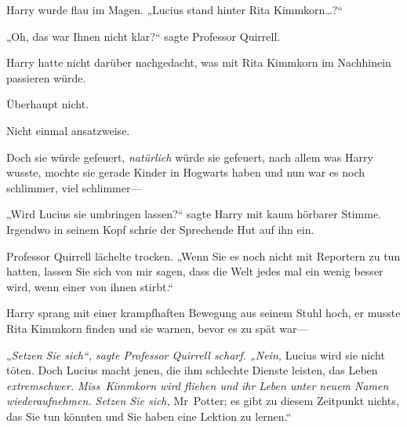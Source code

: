 Harry wurde flau im Magen. „Lucius stand hinter Rita Kimmkorn…?“

„Oh, das war Ihnen nicht klar?“ sagte Professor Quirrell.

Harry hatte nicht darüber nachgedacht, was mit Rita Kimmkorn im Nachhinein passieren würde.

Überhaupt nicht.

Nicht einmal ansatzweise.

Doch sie würde gefeuert, \emph{natürlich} würde sie gefeuert, nach allem was Harry wusste, mochte sie gerade Kinder in Hogwarts haben und nun war es noch schlimmer, viel schlimmer—

„Wird Lucius sie umbringen lassen?“ sagte Harry mit kaum hörbarer Stimme. Irgendwo in seinem Kopf schrie der Sprechende Hut auf ihn ein.

Professor Quirrell lächelte trocken. „Wenn Sie es noch nicht mit Reportern zu tun hatten, lassen Sie sich von mir sagen, dass die Welt jedes mal ein wenig besser wird, wenn einer von ihnen stirbt.“

Harry sprang mit einer krampfhaften Bewegung aus seinem Stuhl hoch, er musste Rita Kimmkorn finden und sie warnen, bevor es zu spät war—

„\emph{Setzen Sie sich“, sagte Professor Quirrell scharf. „Nein,} Lucius wird sie nicht töten. Doch Lucius macht jenen, die ihm schlechte Dienste leisten, das Leben \emph{extremschwer. Miss~Kimmkorn wird fliehen und ihr Leben unter neuem Namen wiederaufnehmen.} \emph{Setzen Sie sich,} Mr~Potter; es gibt zu diesem Zeitpunkt nichts, das Sie tun könnten und Sie haben eine Lektion zu lernen.“

